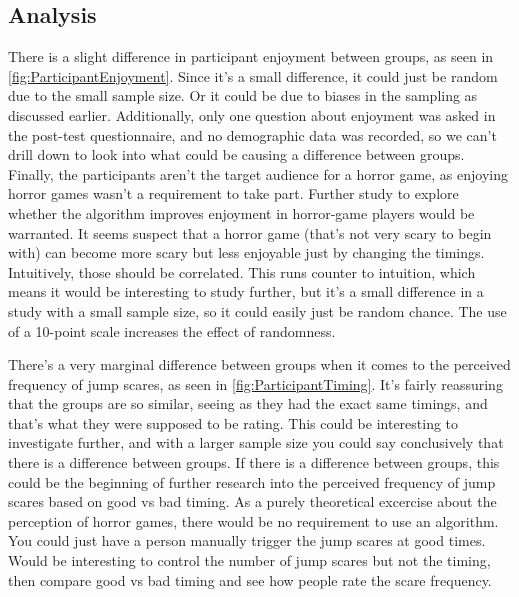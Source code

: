 \documentclass[12pt,a4paper]{article}\usepackage[]{graphicx}\usepackage[]{color}
\begin{document}
\subsection{Analysis}
There is a slight difference in participant enjoyment between groups, as seen in \vref{fig:ParticipantEnjoyment}.
Since it's a small difference, it could just be random due to the small sample size.
Or it could be due to biases in the sampling as discussed earlier.
Additionally, only one question about enjoyment was asked in the post-test questionnaire, and no demographic data was recorded, so we can't drill down to look into what could be causing a difference between groups.
Finally, the participants aren't the target audience for a horror game, as enjoying horror games wasn't a requirement to take part.
Further study to explore whether the algorithm improves enjoyment in horror-game players would be warranted.
It seems suspect that a horror game (that's not very scary to begin with) can become more scary but less enjoyable just by changing the timings.
Intuitively, those should be correlated.
This runs counter to intuition, which means it would be interesting to study further, but it's a small difference in a study with a small sample size, so it could easily just be random chance.
The use of a 10-point scale increases the effect of randomness.

There's a very marginal difference between groups when it comes to the perceived frequency of jump scares, as seen in \vref{fig:ParticipantTiming}.
It's fairly reassuring that the groups are so similar, seeing as they had the exact same timings, and that's what they were supposed to be rating.
This could be interesting to investigate further, and with a larger sample size you could say conclusively that there is a difference between groups.
If there is a difference between groups, this could be the beginning of further research into the perceived frequency of jump scares based on good vs bad timing.
As a purely theoretical excercise about the perception of horror games, there would be no requirement to use an algorithm.
You could just have a person manually trigger the jump scares at good times.
Would be interesting to control the number of jump scares but not the timing, then compare good vs bad timing and see how people rate the scare frequency.
\end{document}
